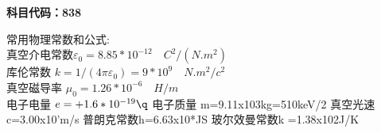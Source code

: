 
\textbf{科目代码：838}

常用物理常数和公式:\\
真空介电常数$\varepsilon_0=8.85 *10^{-12} \quad C^2/(N.m^2)$\\
库伦常数 $k=1/(4\pi \varepsilon_0)=9*10^9 \quad N.m^2/c^2$\\
真空磁导率 $\mu_0=1.26*10^{-6}\quad H/m$\\
电子电量 $e=+1.6*10^{-19}\q$
电子质量 m=9.11x103kg=510keV/2
真空光速 c=3.00x10'm/s
普朗克常数h=6.63x10*JS
玻尔效曼常数k =1.38x102J/K
